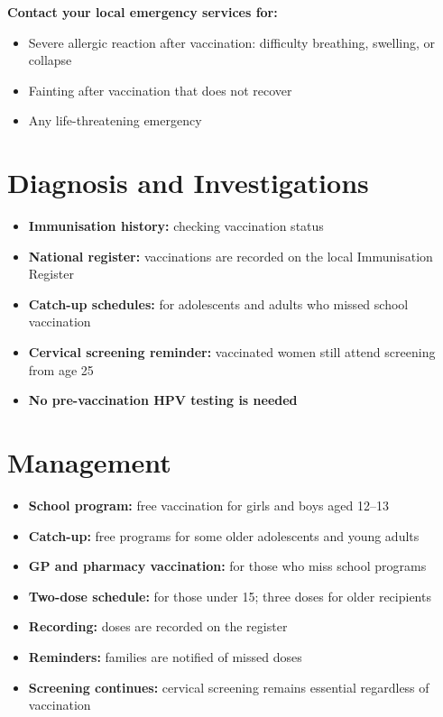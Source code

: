 \textbf{Contact your local emergency services for:}
\begin{itemize}
    \item Severe allergic reaction after vaccination: difficulty breathing, swelling, or collapse
    \item Fainting after vaccination that does not recover
    \item Any life-threatening emergency
\end{itemize}

\section*{Diagnosis and Investigations}
\begin{itemize}
    \item \textbf{Immunisation history:} checking vaccination status
    \item \textbf{National register:} vaccinations are recorded on the local Immunisation Register
    \item \textbf{Catch-up schedules:} for adolescents and adults who missed school vaccination
    \item \textbf{Cervical screening reminder:} vaccinated women still attend screening from age 25
    \item \textbf{No pre-vaccination HPV testing is needed}
\end{itemize}

\section*{Management}
\begin{itemize}
    \item \textbf{School program:} free vaccination for girls and boys aged 12--13
    \item \textbf{Catch-up:} free programs for some older adolescents and young adults
    \item \textbf{GP and pharmacy vaccination:} for those who miss school programs
    \item \textbf{Two-dose schedule:} for those under 15; three doses for older recipients
    \item \textbf{Recording:} doses are recorded on the register
    \item \textbf{Reminders:} families are notified of missed doses
    \item \textbf{Screening continues:} cervical screening remains essential regardless of vaccination
\end{itemize}

